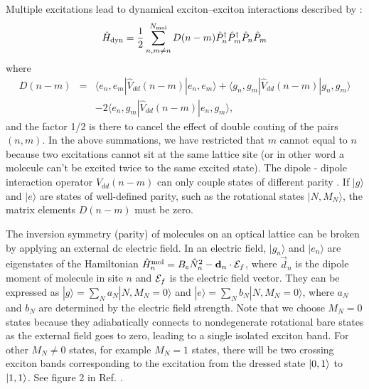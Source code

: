 Multiple excitations lead to dynamical exciton--exciton interactions described by \cite{agranovich}:
\begin{equation}\label{dynamical}
\hat{H}_{\rm dyn} = \frac{1}{2} \sum\limits_{n,m \neq n}^{N_{\rm mol}} D(n-m)
\hat{P}_{n}^\dag \hat{P}_{m}^\dag \hat{P}_{n} \hat{P}_{m} 
\end{equation}
where 
\begin{eqnarray}
D(n - m)& =& \langle e_{n}, e_{m} | \hat{V}_{dd}(n-m) | e_{n}, e_{m} \rangle +
\langle g_{n}, g_{m} | \hat{V}_{dd}(n-m) | g_{n}, g_{m} \rangle  \nonumber \\
& & - 2\langle e_{n}, g_{m} |\hat{V}_{dd}(n-m) | e_{n}, g_{m} \rangle ,
\end{eqnarray} 
and the factor 1/2 is there to cancel the effect of double couting of the pairs $(n, m)$. In the above summations, we
 have restricted that $m$ cannot equal to $n$ because two excitations cannot sit at the same lattice site (or in other
 word a molecule can't be excited twice to the same excited state). The dipole - dipole interaction operator
 $\hat{V}_{dd}(n-m)$ can only couple states of different parity \cite{RotSpect}. If $|g \rangle$ and $| e \rangle$ are
 states of well-defined parity, such as the rotational states $|N, M_N \rangle$, the matrix elements $D(n-m)$ must be
 zero. 

 The inversion symmetry (parity) of molecules on an optical lattice can be broken by applying an external dc electric
 field. In an electric field, $|g_{n} \rangle$ and $| e_{n} \rangle$ are eigenstates of the Hamiltonian 
$\hat{H}^{\rm mol}_n = B_e \hat{N}_n^2 - {\vec d}_n \cdot  {\vec {\cal E}_f}$, where ${\vec d}_n$ is the dipole moment
 of molecule in site $n$ and ${\vec {\cal E}_f}$ is the electric field vector. They can be expressed as 
$| g \rangle = \sum_N a_N |N, M_N = 0 \rangle$ and $| e \rangle = \sum_N b_N |N, M_N = 0 \rangle$, where 
 $a_N$ and $b_N$ are determined by the electric field strength. Note that we choose $M_N=0$ states because they
 adiabatically connects to nondegenerate rotational bare states as the external field goes to zero, leading to a single isolated exciton band. For other $M_N\neq0$ states, for example $M_N = 1$ states, there will be two crossing exciton
bands corresponding to the excitation from the dressed state $\ket{0, 1}$ to $\ket{1, 1}$. See figure 2 in Ref. \cite{felipe}. 
 
